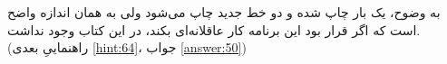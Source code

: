\section{}
\paragraph{}\label{hint:214}
به وضوح،  یک بار چاپ شده و دو خط جدید چاپ می‌شود ولی به همان اندازه واضح است که اگر قرار بود این برنامه کار عاقلانه‌ای بکند، در این کتاب وجود نداشت. (راهنماییِ بعدی \ref{hint:64}، جواب \ref{answer:50})
